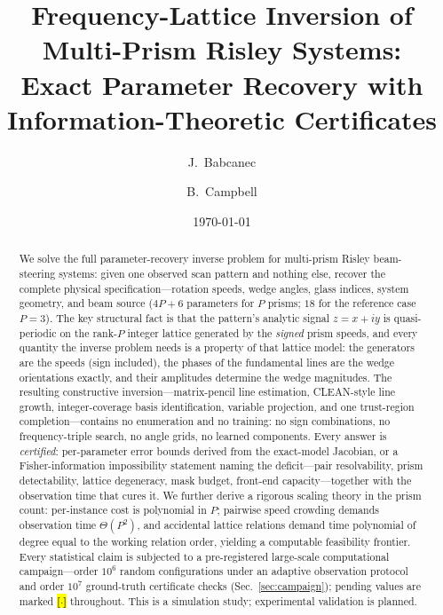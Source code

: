 \documentclass[twocolumn,preprintnumbers,amsmath,amssymb,pra,floatfix]{revtex4-2}
\newcommand{\PH}[1]{\colorbox{yellow}{\textbf{\small [#1]}}}
\begin{document}
\title{Frequency-Lattice Inversion of Multi-Prism Risley Systems:\\
Exact Parameter Recovery with Information-Theoretic Certificates}

\author{J.~Babcanec}
\author{B.~Campbell}

\date{\today}

\begin{abstract}
We solve the full parameter-recovery inverse problem for multi-prism
Risley beam-steering systems: given one observed scan pattern and
nothing else, recover the complete physical specification---rotation
speeds, wedge angles, glass indices, system geometry, and beam source
($4P+6$ parameters for $P$ prisms; $18$ for the reference case
$P{=}3$).  The key structural fact is that the pattern's analytic
signal $z=x+iy$ is quasi-periodic on the rank-$P$ integer lattice
generated by the \emph{signed} prism speeds, and every quantity the
inverse problem needs is a property of that lattice model: the
generators are the speeds (sign included), the phases of the
fundamental lines are the wedge orientations exactly, and their
amplitudes determine the wedge magnitudes.  The resulting constructive
inversion---matrix-pencil line estimation, CLEAN-style line growth,
integer-coverage basis identification, variable projection, and one
trust-region completion---contains no enumeration and no training: no
sign combinations, no frequency-triple search, no angle grids, no
learned components.  Every answer is \emph{certified}: per-parameter
error bounds derived from the exact-model Jacobian, or a
Fisher-information impossibility statement naming the
deficit---pair resolvability, prism detectability, lattice degeneracy,
mask budget, front-end capacity---together with the observation time
that cures it.  We further derive a rigorous scaling theory in the
prism count: per-instance cost is polynomial in $P$; pairwise speed
crowding demands observation time $\Theta(P^{2})$, and accidental
lattice relations demand time polynomial of degree equal to the
working relation order, yielding a computable feasibility frontier.
Every statistical claim is subjected to a pre-registered large-scale
computational campaign---order $10^{6}$ random configurations under an
adaptive observation protocol and order $10^{7}$ ground-truth
certificate checks (Sec.~\ref{sec:campaign}); pending values are marked
\PH{$\cdot$} throughout.
This is a simulation study; experimental validation is planned.
\end{abstract}
\end{document}
